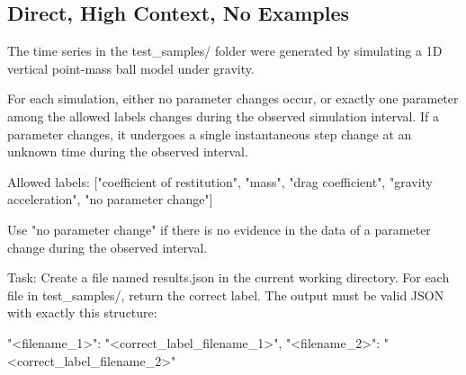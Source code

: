 \documentclass[11pt]{article}
\begin{document}
\subsection*{Direct, High Context, No Examples}
\begin{DocCode}
The time series in the test_samples/ folder were generated by simulating a 1D vertical point-mass ball model under gravity.

For each simulation, either no parameter changes occur, or exactly one parameter among the allowed labels changes during the observed simulation interval.
If a parameter changes, it undergoes a single instantaneous step change at an unknown time during the observed interval.

Allowed labels:
["coefficient of restitution", "mass", "drag coefficient", "gravity acceleration", "no parameter change"]

Use "no parameter change" if there is no evidence in the data of a parameter change during the observed interval.

Task:
Create a file named results.json in the current working directory.
For each file in test_samples/, return the correct label.
The output must be valid JSON with exactly this structure:
{

  "<filename_1>": "<correct_label_filename_1>",
  "<filename_2>": "<correct_label_filename_2>"

}
\end{DocCode}
\end{document}
